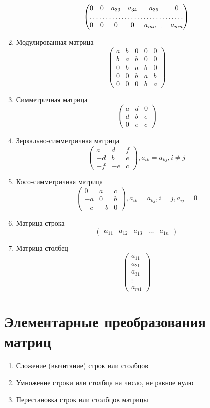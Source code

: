 \documentclass[11pt]{proc}
\begin{document}
\begin{enumerate}
{\[\begin{pmatrix}
				0 & 0 & a_{33} & a_{34} & a_{35} & 0\\
				\hdotsfor{6}\\
				0 & 0 & 0 & 0 & a_{mn-1} & a_{mn}
			\end{pmatrix}
		\]
	}
	\item{Модулированная матрица
		\[
			\begin{pmatrix}
				a & b & 0 & 0 & 0\\
				b & a & b & 0 & 0\\
				0 & b & a & b & 0\\
				0 & 0 & b & a & b\\
				0 & 0 & 0 & b & a
			\end{pmatrix}
		\]
	}
	\item{Симметричная матрица
		\[
			\begin{pmatrix}
				a & d & 0\\
				d & b & e\\
				0 & e & c
			\end{pmatrix}
		\]
	}
	\item{Зеркально-симметричная матрица
		\[
			\begin{pmatrix}
				a & d & f\\
				-d & b & e\\
				-f & -e & c
			\end{pmatrix}, a_{ik} = a_{kj}, i \neq j
		\]
	}
	\item{Косо-симметричная матрица
		\[
			\begin{pmatrix}
				0 & a & c\\
				-a & 0 & b\\
				-c & -b & 0
			\end{pmatrix}, a_{ik} = a_{kj}, i = j, a_{ij} = 0
		\]
	}
	\item{Матрица-строка
		\[
			\begin{pmatrix}
				a_{11} & a_{12} & a_{13} & \dots & a_{1n}
			\end{pmatrix}
		\]
	}
	\item{Матрица-столбец
		\[
			\begin{pmatrix}
				a_{11}\\
				a_{21}\\
				a_{31}\\
				\vdots\\
				a_{m1}
			\end{pmatrix}
		\]
	}
\end{enumerate}
\section{Элементарные преобразования матриц}
\begin{enumerate}
	\item{Сложение (вычитание) строк или столбцов}
	\item{Умножение строки или столбца на число, не равное нулю}
	\item{Перестановка строк или столбцов матрицы}
\end{enumerate}
\end{document}
